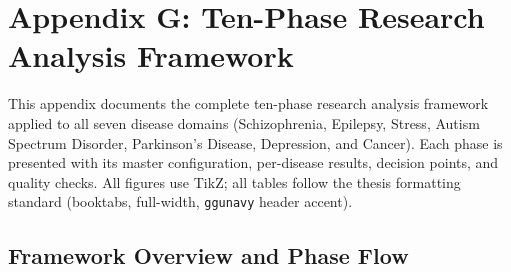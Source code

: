 
\chapter*{Appendix G: Ten-Phase Research Analysis Framework}
\label{app:analysis_framework}

\normalsize\normalfont\color{black}

This appendix documents the complete ten-phase research analysis framework applied to all seven disease domains (Schizophrenia, Epilepsy, Stress, Autism Spectrum Disorder, Parkinson's Disease, Depression, and Cancer). Each phase is presented with its master configuration, per-disease results, decision points, and quality checks. All figures use TikZ; all tables follow the thesis formatting standard (booktabs, full-width, \texttt{ggunavy} header accent).

\section{Framework Overview and Phase Flow}
\label{sec:framework_overview}

